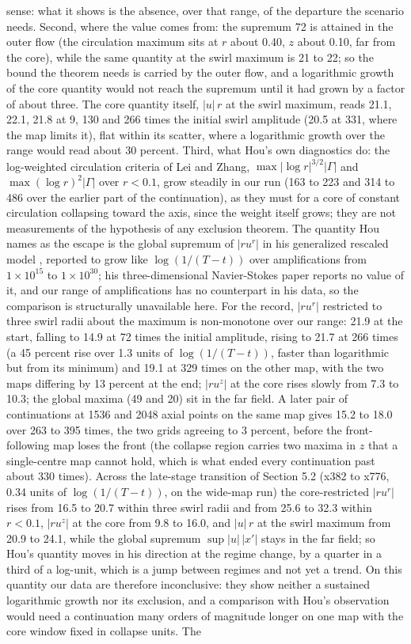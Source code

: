 \documentclass[11pt]{article}
\newcommand{\sn}[2]{#1\times 10^{#2}}
\begin{document}
sense: what it shows is the absence, over that range, of the departure the scenario needs. Second, where the value comes from: the supremum 72 is attained in the outer flow (the circulation maximum sits at $r$ about 0.40, $z$ about 0.10, far from the core), while the same quantity at the swirl maximum is 21 to 22; so the bound the theorem needs is carried by the outer flow, and a logarithmic growth of the core quantity would not reach the supremum until it had grown by a factor of about three. The core quantity itself, $|u|\, r$ at the swirl maximum, reads 21.1, 22.1, 21.8 at 9, 130 and 266 times the initial swirl amplitude (20.5 at 331, where the map limits it), flat within its scatter, where a logarithmic growth over the range would read about 30 percent. Third, what Hou's own diagnostics do: the log-weighted circulation criteria of Lei and Zhang, $\max |\log r|^{3/2} |\Gamma|$ and $\max (\log r)^2 |\Gamma|$ over $r < 0.1$, grow steadily in our run (163 to 223 and 314 to 486 over the earlier part of the continuation), as they must for a core of constant circulation collapsing toward the axis, since the weight itself grows; they are not measurements of the hypothesis of any exclusion theorem. The quantity Hou names as the escape is the global supremum of $|r u^r|$ in his generalized rescaled model \cite[Sec. 1.5 and 5.4.4]{H24}, reported to grow like $\log(1/(T - t))$ over amplifications from $\sn{1}{15}$ to $\sn{1}{30}$; his three-dimensional Navier-Stokes paper \cite{H23b} reports no value of it, and our range of amplifications has no counterpart in his data, so the comparison is structurally unavailable here. For the record, $|r u^r|$ restricted to three swirl radii about the maximum is non-monotone over our range: 21.9 at the start, falling to 14.9 at 72 times the initial amplitude, rising to 21.7 at 266 times (a 45 percent rise over 1.3 units of $\log(1/(T - t))$, faster than logarithmic but from its minimum) and 19.1 at 329 times on the other map, with the two maps differing by 13 percent at the end; $|r u^z|$ at the core rises slowly from 7.3 to 10.3; the global maxima (49 and 20) sit in the far field. A later pair of continuations at 1536 and 2048 axial points on the same map gives 15.2 to 18.0 over 263 to 395 times, the two grids agreeing to 3 percent, before the front-following map loses the front (the collapse region carries two maxima in $z$ that a single-centre map cannot hold, which is what ended every continuation past about 330 times). Across the late-stage transition of Section 5.2 (x382 to x776, 0.34 units of $\log(1/(T - t))$, on the wide-map run) the core-restricted $|r u^r|$ rises from 16.5 to 20.7 within three swirl radii and from 25.6 to 32.3 within $r < 0.1$, $|r u^z|$ at the core from 9.8 to 16.0, and $|u|\, r$ at the swirl maximum from 20.9 to 24.1, while the global supremum $\sup |u|\,|x'|$ stays in the far field; so Hou's quantity moves in his direction at the regime change, by a quarter in a third of a log-unit, which is a jump between regimes and not yet a trend. On this quantity our data are therefore inconclusive: they show neither a sustained logarithmic growth nor its exclusion, and a comparison with Hou's observation would need a continuation many orders of magnitude longer on one map with the core window fixed in collapse units. The 
\end{document}
